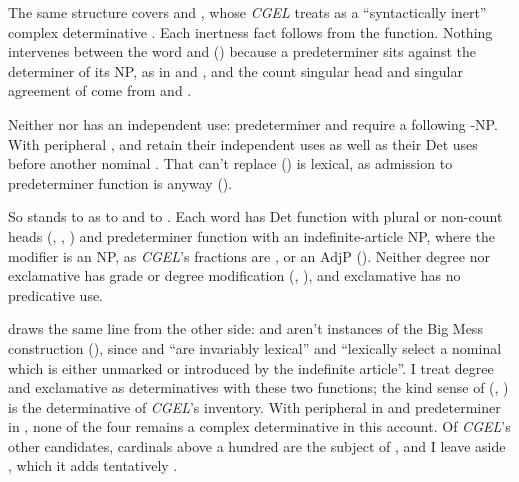 \documentclass[12pt]{article}
\begin{document}
The same structure covers  and , whose  \textit{CGEL} treats as a \enquote{syntactically inert} complex determinative \citep[394]{huddleston2002}. Each inertness fact follows from the function. Nothing intervenes between the word and  () because a predeterminer sits against the determiner of its NP, as in  and , and the count singular head and singular agreement of  come from  and .

Neither  nor  has an independent use: predeterminer  and  require a following -NP. With peripheral ,  and  retain their independent uses as well as their Det uses before another nominal \citep[392, 394]{huddleston2002}. That  can't replace  () is lexical, as admission to predeterminer function is anyway ().

So  stands to  as  to  and  to . Each word has Det function with plural or non-count heads (, , ) and predeterminer function with an indefinite-article NP, where the modifier is an NP, as \textit{CGEL}'s fractions are \citep[385 n.~25]{huddleston2002}, or an AdjP (). Neither degree  nor exclamative  has grade or degree modification (, ), and exclamative  has no predicative use.

\textcite[§5]{VanEynde_2007_BigMess} draws the same line from the other side:  and  aren't instances of the Big Mess construction (), since  and  \enquote{are invariably lexical} and \enquote{lexically select a nominal which is either unmarked or introduced by the indefinite article}. I treat degree  and exclamative  as determinatives with these two functions; the kind sense of  (, ) is the determinative  of \textit{CGEL}'s inventory. With peripheral  in  and predeterminer  in , none of the four remains a complex determinative in this account. Of \textit{CGEL}'s other candidates, cardinals above a hundred are the subject of \textcite{reynolds2026numerals}, and I leave aside , which it adds tentatively \citep[393]{huddleston2002}.
\end{document}
